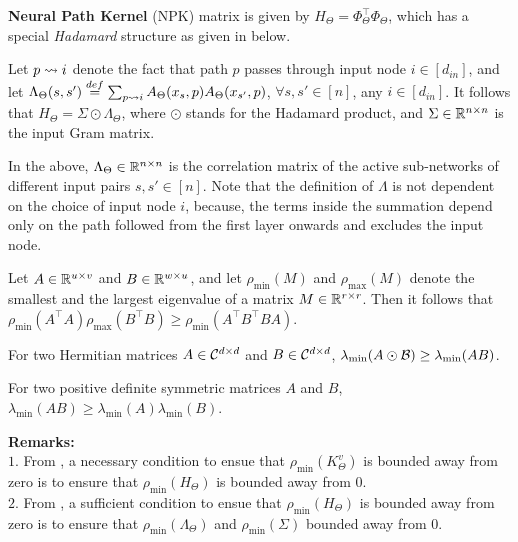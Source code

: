 \textbf{Neural Path Kernel} (NPK) matrix is given by $H_{\Theta}=\Phi^\top_{\Theta}\Phi_{\Theta}$, which has a special \emph{Hadamard} structure as given in  below.
\begin{lemma}\label{lm:npk}
Let $p\rightsquigarrow i$ denote the fact that path $p$ passes through input node $i\in[d_{in}]$, and let $\Lambda_{\Theta}(s,s')\stackrel{def}{=}\sum_{p\rightsquigarrow i} A_{\Theta}(x_s,p) A_{\Theta}(x_{s'},p)$, $\forall s,s'\in[n]$, any $i\in [d_{in}]$. It follows that $H_{\Theta}= \Sigma\odot\Lambda_{\Theta}$, where $\odot$ stands for the Hadamard product, and $\Sigma \in \mathbb{R}^{n\times n}$ is the input Gram matrix.
\end{lemma}
In the  above, $\Lambda_{\Theta}\in\mathbb{R}^{n\times n}$ is the correlation matrix of the active sub-networks of different input pairs $s,s'\in[n]$. Note that the definition of $\Lambda$ is not dependent on the choice of input node $i$, because, the terms inside the summation depend only on the path followed from the first layer onwards and excludes the input node.
\begin{lemma}\label{lm:nec}
Let $A\in\mathbb{R}^{u\times v}$ and $B\in\mathbb{R}^{w\times u}$, and let $\rho_{\min}(M)$ and $\rho_{\max}(M)$ denote the smallest and the largest eigenvalue of a matrix $M\in\mathbb{R}^{r\times r}$. Then it follows that $\rho_{\min}(A^\top A)\rho_{\max}(B^\top B)\geq \rho_{\min}(A^\top B^\top BA)$.
\end{lemma}
\begin{theorem} 
For two Hermitian matrices $A\in \mathcal{C}^{d\times d}$ and $B\in \mathcal{C}^{d\times d}$, $\lambda_{\min}(A\odot\mathcal{B})\geq \lambda_{\min} (AB)$. 
\end{theorem}
\begin{lemma}\label{lm:suf}
For two positive definite symmetric matrices $A$ and $B$, $\lambda_{\min}(AB)\geq \lambda_{\min} (A)\lambda_{\min}(B)$. 
\end{lemma}
\textbf{Remarks:}\\
$1.$ From , a necessary condition to ensue that $\rho_{\min}(K^v_{\Theta})$ is bounded away from zero is to ensure that $\rho_{\min}(H_{\Theta})$ is bounded away from $0$. \\
$2.$ From , a sufficient condition to ensue that $\rho_{\min}(H_{\Theta})$ is bounded away from zero is to ensure that $\rho_{\min}(\Lambda_{\Theta})$ and $\rho_{\min}(\Sigma)$ bounded away from $0$.

